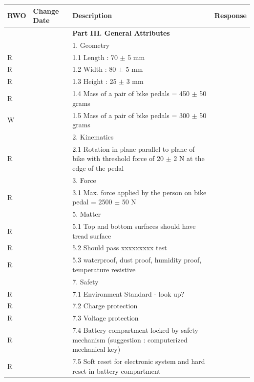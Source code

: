 \documentclass{article}
\begin{document}
	\begin{longtable}{|C{1cm}|C{2cm}|L{9.56cm}|L{4cm}|}
		RWO & Change Date & Description & Response \\
		\hline
		
		& & \textbf{Part III. General Attributes} & \\
		\hline
		& & 1. Geometry & \\
		R & & \hspace{1mm} 1.1 Length : 70 $\pm$ 5 mm & \\
		R & & \hspace{1mm} 1.2 Width : 80 $\pm$ 5 mm & \\
		R & & \hspace{1mm} 1.3 Height : 25 $\pm$ 3 mm & \\
		R & & \hspace{1mm} 1.4 Mass of a pair of bike pedals = 450 $\pm$ 50 grams & \\
		W & & \hspace{1mm} 1.5 Mass of a pair of bike pedals = 300 $\pm$ 50 grams & \\
		\hline
		& & 2. Kinematics & \\
		R & & \hspace{1mm} 2.1 Rotation in plane parallel to plane of bike with threshold force of 20 $\pm$ 2 N at the edge of the pedal & \\ 
		\hline
		& & 3. Force & \\
		R & & \hspace{1mm} 3.1 Max. force applied by the person on bike pedal = 2500 $\pm$ 50 N & \\
		\hline
		& & 5. Matter & \\
		R & & \hspace{1mm} 5.1 Top and bottom surfaces should have tread surface & \\
		R & & \hspace{1mm} 5.2 Should pass xxxxxxxxx test & \\
		R & & \hspace{1mm} 5.3 waterproof, dust proof, humidity proof, temperature resistive & \\
		\hline
		& & 7. Safety & \\
		R & & \hspace{1mm} 7.1 Environment Standard - look up? & \\
		R & & \hspace{1mm} 7.2 Charge protection & \\
		R & & \hspace{1mm} 7.3 Voltage protection  & \\
		R & & \hspace{1mm} 7.4 Battery compartment locked by safety mechanism (suggestion : computerized mechanical key) & \\
		R & & \hspace{1mm} 7.5 Soft reset for electronic system and hard reset in battery compartment & \\
		

\end{longtable}
\end{document}

